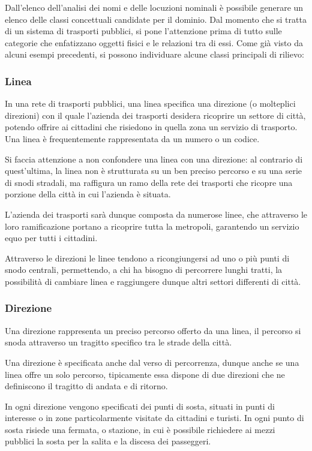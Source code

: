 Dall'elenco dell'analisi dei nomi e delle locuzioni nominali è possibile generare un elenco delle classi concettuali candidate per il dominio. Dal momento che si tratta di un sistema di trasporti pubblici, si pone l'attenzione prima di tutto sulle categorie che enfatizzano oggetti fisici e le relazioni tra di essi.
Come già visto da alcuni esempi precedenti, si possono individuare alcune classi principali di rilievo:

\subsubsection{Linea} %
\label{ssub:linea}
In una rete di trasporti pubblici, una linea specifica una direzione (o molteplici direzioni) con il quale l'azienda dei trasporti desidera ricoprire un settore di città, potendo offrire ai cittadini che risiedono in quella zona un servizio di trasporto. Una linea è frequentemente rappresentata da un numero o un codice. 

Si faccia attenzione a non confondere una linea con una direzione: al contrario di quest'ultima, la linea non è strutturata su un ben preciso percorso e su una serie di snodi stradali, ma raffigura un ramo della rete dei trasporti che ricopre una porzione della città in cui l'azienda è situata.

L'azienda dei trasporti sarà dunque composta da numerose linee, che attraverso le loro ramificazione portano a ricoprire tutta la metropoli, garantendo un servizio equo per tutti i cittadini.

Attraverso le direzioni le linee tendono a ricongiungersi ad uno o più punti di snodo centrali, permettendo, a chi ha bisogno di percorrere lunghi tratti, la possibilità di cambiare linea e raggiungere dunque altri settori differenti di città.

\subsubsection{Direzione} %
\label{ssub:direzione}
Una direzione rappresenta un preciso percorso offerto da una linea, il percorso si snoda attraverso un tragitto specifico tra le strade della città.

Una direzione è specificata anche dal verso di percorrenza, dunque anche se una linea offre un solo percorso, tipicamente essa dispone di due direzioni che ne definiscono il tragitto di andata e di ritorno.

In ogni direzione vengono specificati dei punti di sosta, situati in punti di interesse o in zone particolarmente visitate da cittadini e turisti. In ogni punto di sosta risiede una fermata, o stazione, in cui è possibile richiedere ai mezzi pubblici la sosta per la  salita e la discesa dei passeggeri.


